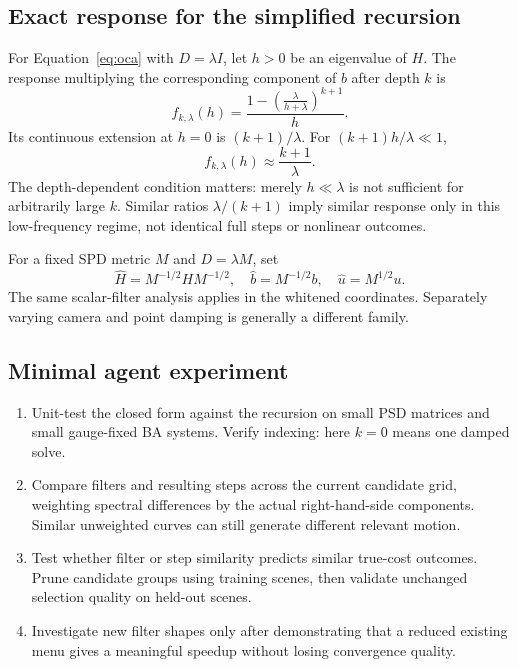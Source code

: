 \documentclass[11pt,a4paper]{article}
\begin{document}
\subsection*{Exact response for the simplified recursion}
For Equation~\eqref{eq:oca} with $D=\lambda I$, let $h>0$ be an eigenvalue of $H$. The response multiplying the corresponding component of $b$ after depth $k$ is
\begin{equation}
 f_{k,\lambda}(h)=\frac{1-\left(\frac{\lambda}{h+\lambda}\right)^{k+1}}{h}.
 \label{eq:filter}
\end{equation}
Its continuous extension at $h=0$ is $(k+1)/\lambda$. For $(k+1)h/\lambda\ll1$,
\begin{equation}
 f_{k,\lambda}(h)\approx\frac{k+1}{\lambda}.
\end{equation}
The depth-dependent condition matters: merely $h\ll\lambda$ is not sufficient for arbitrarily large $k$. Similar ratios $\lambda/(k+1)$ imply similar response only in this low-frequency regime, not identical full steps or nonlinear outcomes.

For a fixed SPD metric $M$ and $D=\lambda M$, set
\begin{equation}
 \widehat H=M^{-1/2}HM^{-1/2},\quad
 \widehat b=M^{-1/2}b,\quad \widehat u=M^{1/2}u.
\end{equation}
The same scalar-filter analysis applies in the whitened coordinates. Separately varying camera and point damping is generally a different family.

\subsection*{Minimal agent experiment}
\begin{enumerate}
\item Unit-test the closed form against the recursion on small PSD matrices and small gauge-fixed BA systems. Verify indexing: here $k=0$ means one damped solve.
\item Compare filters and resulting steps across the current candidate grid, weighting spectral differences by the actual right-hand-side components. Similar unweighted curves can still generate different relevant motion.
\item Test whether filter or step similarity predicts similar true-cost outcomes. Prune candidate groups using training scenes, then validate unchanged selection quality on held-out scenes.
\item Investigate new filter shapes only after demonstrating that a reduced existing menu gives a meaningful speedup without losing convergence quality.
\end{enumerate}
\end{document}

